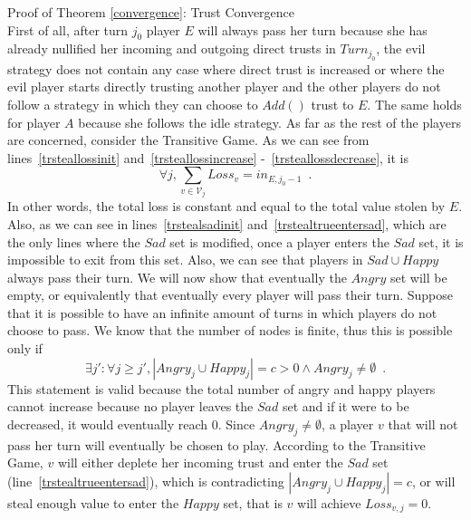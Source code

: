 \begin{sepproof}{Proof of Theorem \ref{convergence}: Trust Convergence} \ \\
\label{convergenceproof}
   First of all, after turn $j_0$ player $E$ will always pass her turn
   because she has already nullified her incoming and outgoing direct trusts in $Turn_{j_0}$, the evil strategy does not
   contain any case where direct trust is increased or where the evil player starts directly trusting another player and
   the other players do not follow a strategy in which they can choose to $Add\left(\right)$ trust to $E$. The same holds
   for player $A$ because she follows the idle strategy. As far as the rest of the players are concerned, consider the
   Transitive Game. As we can see from lines~\ref{trsteallossinit} and~\ref{trsteallossincrease}
   -~\ref{trsteallossdecrease}, it is
   \begin{equation*}
      \forall j, \sum\limits_{v \in \mathcal{V}_j}Loss_v = in_{E, j_0-1} \enspace.
   \end{equation*}
   In other words, the total loss is constant and equal to the total value stolen by $E$. Also, as we can see in
   lines~\ref{trstealsadinit} and~\ref{trstealtrueentersad}, which are the only lines where the $Sad$ set is modified,
   once a player enters the $Sad$ set, it is impossible to exit from this set. Also, we can see that players in $Sad
   \cup Happy$ always pass their turn. We will now show that eventually the $Angry$ set will be empty, or equivalently
   that eventually every player will pass their turn. Suppose that it is possible to have an infinite amount of turns
   in which players do not choose to pass. We know that the number of nodes is finite, thus this is possible only if
   \begin{equation*}
      \exists j': \forall j \geq j', |Angry_j \cup Happy_j| = c > 0 \wedge Angry_j \neq \emptyset \enspace.
   \end{equation*}
   This statement is valid because the total number of angry and happy players cannot increase because no player leaves
   the $Sad$ set and if it were to be decreased, it would eventually reach 0. Since $Angry_j \neq \emptyset$, a player
   $v$ that will not pass her turn will eventually be chosen to play. According to the Transitive Game, $v$ will either
   deplete her incoming trust and enter the $Sad$ set (line~\ref{trstealtrueentersad}), which is contradicting $|Angry_j
   \cup Happy_j| = c$, or will steal enough value to enter the $Happy$ set, that is $v$ will achieve $Loss_{v, j} = 0$.

\end{sepproof}
